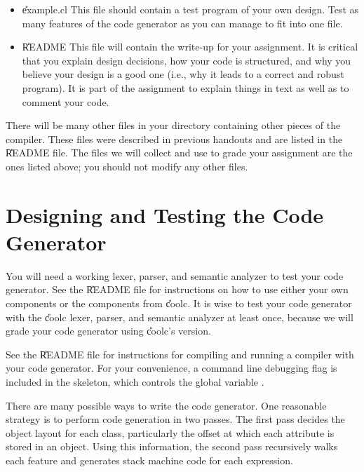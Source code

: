 \begin{itemize}
\item \U{example.cl}
This file should contain a test program of your own design.  
Test as many features of the code generator as you can manage to 
fit into one file.

\item \U{README}
This file will contain the write-up for your assignment. 
It is critical that you explain design decisions, how your
code is structured, and why you believe your design is a good one
(i.e., why it leads to a correct and robust program).  It is part of
the assignment to explain things in text as well as to comment your
code. 

\end{itemize}

There will be many other files in your directory containing other
pieces of the compiler.  These files were described in previous
handouts and are listed in the \U{README} file.  The files we will
collect and use to grade your assignment are the ones listed above;
you should not modify any other files.

\section{Designing and Testing the Code Generator}

You will need a working lexer, parser, and semantic analyzer to test
your code generator.  See the \U{README} file for instructions on how
to use either your own components or the components from \U{coolc}.
It is wise to test your code generator with the \U{coolc} lexer,
parser, and semantic analyzer at least once, because we will grade
your code generator using \U{coolc}'s version. 

See the \U{README} file for instructions for compiling and running
a compiler with your code generator.  For your convenience, a command
line debugging flag  is included in the skeleton, which controls
the global variable .

There are many possible ways to write the code generator.  One
reasonable strategy is to perform code generation in two passes.  The
first pass decides the object layout for each class, particularly the
offset at which each attribute is stored in an object.  Using this
information, the second pass recursively walks each feature and
generates stack machine code for each expression.

